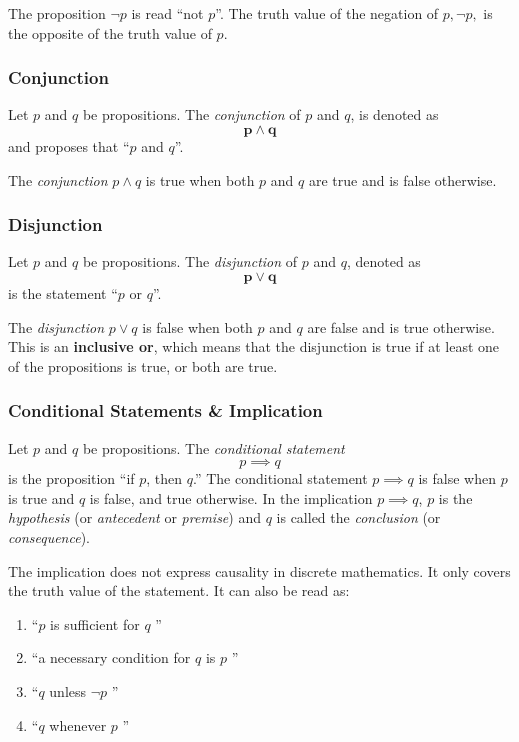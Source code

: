 The proposition \(\neg p\) is read ``not \(p\)''. The truth value of the negation of \(p, \neg p, \) is the opposite of the truth value of \(p\).

\subsubsection{Conjunction}
Let \(p\) and \(q\) be propositions. The \emph{conjunction} of \(p\) and \(q\), is denoted as \[\mathbf{p \wedge q }\] and proposes that ``\(p\) and \(q\)''.

The \emph{conjunction} \(p \wedge q\) is true when both \(p\) and \(q\) are true and is false otherwise.

\subsubsection{Disjunction}
Let \(p\) and \(q\) be propositions. The \emph{disjunction} of \(p\) and \(q\), denoted as \[\mathbf{p \vee q }\] is the statement ``\(p\) or \(q\)''.

The \emph{disjunction} \(p \vee q\) is false when both \(p\) and \(q\) are false and is true otherwise. This is an \textbf{inclusive or}, which means that the disjunction is true if at least one of the propositions is true, or both are true.

\subsubsection{Conditional Statements \& Implication}
Let \( p \) and \( q \) be propositions. The \emph{conditional statement} \[
p \implies q	
\]
is the proposition ``if \( p \), then \( q \).'' The conditional statement \( p \implies q \) is false when \( p \) is true and \( q \) is false, and true otherwise. In the implication \( p \implies q \), \( p \) is the \emph{hypothesis} (or \emph{antecedent} or \emph{premise}) and \( q \) is called the \emph{conclusion} (or \emph{consequence}).

The implication does not express causality in discrete mathematics. It only covers the truth value of the statement. It can also be read as:

\begin{enumerate}
	\item ``\( p \) is sufficient for \( q \) ''
	\item ``a necessary condition for \( q \) is \( p \) ''
	\item ``\( q \) unless \( \neg p \) ''
	\item ``\( q \) whenever \( p \) ''
\end{enumerate}

